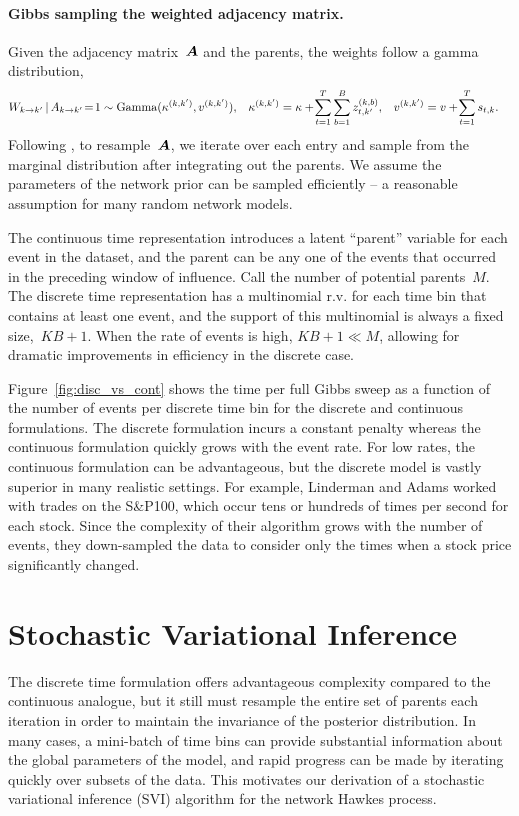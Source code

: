 \paragraph{Gibbs sampling the weighted adjacency matrix.}
Given the adjacency matrix~$\boldsymbol{A}$ and the parents, the weights follow a gamma distribution,
\begin{align*}
W_{k \to k'} \,|\, A_{k \to k'}\!=\!1 &\sim \mathrm{Gamma}(\kappa^{(k,k')}, v^{(k,k')}), &
\kappa^{(k,k')} &= \kappa +\! \sum_{t=1}^T \sum_{b=1}^B z_{t,k'}^{(k,b)}, &
{v}^{(k,k')} &= v +\! \sum_{t=1}^T s_{t,k}.
\end{align*}
Following \citet{Linderman-2014}, to resample~$\boldsymbol{A}$, we iterate over each entry and sample from the marginal distribution after integrating out the parents. We assume the parameters of the network prior can be sampled efficiently -- a reasonable assumption for many random network models.

The continuous time representation introduces a latent ``parent'' variable for each event in the dataset, and the parent can be any one of the events that occurred in the preceding window of influence. Call the number of potential parents~$M$. The discrete time representation has a multinomial r.v. for each time bin that contains at least one event, and the support of this multinomial is always a fixed size,~${KB+1}$.  When the rate of events is high, $KB+1 \ll M$, allowing for dramatic improvements in efficiency in the discrete case. 

Figure~\ref{fig:disc_vs_cont} shows the time per full Gibbs sweep as a function of the number of events per discrete time bin for the discrete and continuous formulations. The discrete formulation incurs a constant penalty whereas the continuous formulation quickly grows with the event rate. For low rates, the continuous formulation can be advantageous, but the discrete model is vastly superior in many realistic settings. For example, Linderman and Adams worked with trades on the S\&P100, which occur tens or hundreds of times per second for each stock. Since the complexity of their algorithm grows with the number of events, they down-sampled the data to consider only the times when a stock price significantly changed.  

\section{Stochastic Variational Inference}
The discrete time formulation offers advantageous complexity compared to the continuous analogue, but it still must resample the entire set of parents each iteration in order to maintain the invariance of the posterior distribution. In many cases, a mini-batch of time bins can provide substantial information about the global parameters of the model, and rapid progress can be made by iterating quickly over subsets of the data. This motivates our derivation of a stochastic variational inference (SVI) algorithm for the network Hawkes process. 

